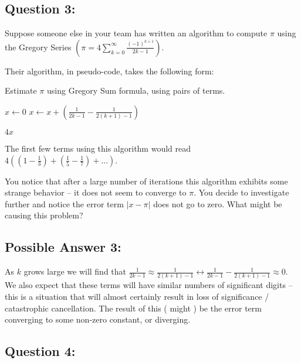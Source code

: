 \documentclass[letterpaper,11pt]{article}
\begin{document}
\subsection*{Question 3:}

Suppose someone else in your team has written an algorithm to compute $\pi$
 using the Gregory Series $ \left( \pi = 4 \sum_{k=0}^{\infty} \frac{ (-1)^{k+1} }{ 2k - 1 } \right)$.

Their algorithm, in pseudo-code, takes the following form:

 \FloatBarrier
 \begin{algorithm}[!htbp]
   \caption{ Estimate $\pi$ using Gregory Sum formula, using pairs of terms.}
   \begin{algorithmic}[1]
    \State $x \gets 0$
      \State $x \gets x + \left( \frac{1}{2k-1} - \frac{1}{2( k + 1 ) -1} \right)$
     \EndFor
   \end{algorithmic}
   \Return $4 x$
 \end{algorithm}
 \FloatBarrier

The first few terms using this algorithm would read $
4( ( 1 - \frac{1}{3} ) + ( \frac{1}{5} - \frac{1}{7} ) + \dots )$.

You notice that after a large number of iterations this algorithm exhibits some strange
 behavior -- it does not seem to converge to $\pi$. You decide to investigate further
 and notice the error term $\lvert x - \pi \rvert$ does not go to zero. What
  might be causing this problem?

\subsection*{Possible Answer 3:}

As $k$ grows large we will find that $\frac{1}{2k-1} \approx \frac{1}{2( k + 1 ) -1}
\leftrightarrow \frac{1}{2k-1} - \frac{1}{2( k + 1 ) -1} \approx 0$.
We also expect that these terms will have similar numbers of significant digits --
 this is a situation that will almost certainly result in loss of significance /
 catastrophic cancellation. The result of this ( might ) be the error term
 converging to some non-zero constant, or diverging.

\subsection*{Question 4:}
\end{document}
